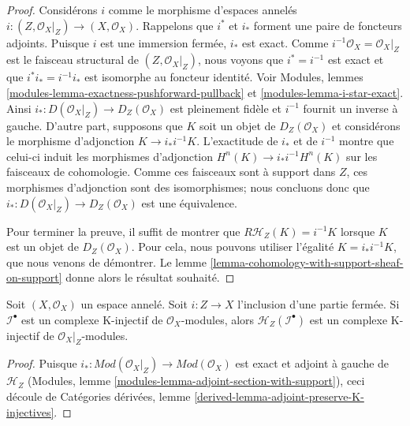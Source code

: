 {\begin{proof}
Considérons $i$ comme le morphisme d'espaces annelés
$i : (Z, \mathcal{O}_X|_Z) \to (X, \mathcal{O}_X)$. Rappelons que $i^*$ et $i_*$ forment une paire de foncteurs adjoints. Puisque $i$ est une immersion fermée, $i_*$ est exact. Comme $i^{-1}\mathcal{O}_X = \mathcal{O}_X|_Z$ est le faisceau structural de $(Z, \mathcal{O}_X|_Z)$, nous voyons que $i^* = i^{-1}$
est exact et que $i^*i_* = i^{-1}i_*$
est isomorphe au foncteur identité. Voir Modules, lemmes \ref{modules-lemma-exactness-pushforward-pullback} et
\ref{modules-lemma-i-star-exact}. Ainsi
$i_* : D(\mathcal{O}_X|_Z) \to D_Z(\mathcal{O}_X)$
est pleinement fidèle et $i^{-1}$ fournit un inverse à gauche. D'autre part, supposons que $K$ soit un objet de
$D_Z(\mathcal{O}_X)$ et considérons le morphisme d'adjonction
$K \to i_*i^{-1}K$. L'exactitude de $i_*$ et de $i^{-1}$ montre que celui-ci induit les morphismes d'adjonction
$H^n(K) \to i_*i^{-1}H^n(K)$ sur les faisceaux de cohomologie. Comme ces faisceaux sont à support dans $Z$, ces morphismes d'adjonction sont des isomorphismes; nous concluons donc que $i_* : D(\mathcal{O}_X|_Z) \to D_Z(\mathcal{O}_X)$
est une équivalence.

\medskip\noindent

Pour terminer la preuve, il suffit de montrer que $R\mathcal{H}_Z(K) = i^{-1}K$ lorsque
$K$ est un objet de $D_Z(\mathcal{O}_X)$. Pour cela, nous pouvons utiliser l'égalité
$K = i_*i^{-1}K$, que nous venons de démontrer. Le lemme \ref{lemma-cohomology-with-support-sheaf-on-support}
donne alors le résultat souhaité.

\end{proof}

\begin{lemma}

\label{lemma-sections-with-support-K-injective}
Soit $(X, \mathcal{O}_X)$ un espace annelé. Soit $i : Z \to X$ l'inclusion d'une partie fermée. Si $\mathcal{I}^\bullet$ est un complexe K-injectif de $\mathcal{O}_X$-modules, alors $\mathcal{H}_Z(\mathcal{I}^\bullet)$ est un complexe K-injectif de $\mathcal{O}_X|_Z$-modules.
\end{lemma}

\begin{proof}
Puisque $i_* : \textit{Mod}(\mathcal{O}_X|_Z) \to \textit{Mod}(\mathcal{O}_X)$ est exact et adjoint à gauche de $\mathcal{H}_Z$ (Modules, lemme \ref{modules-lemma-adjoint-section-with-support}), ceci découle de Catégories dérivées, lemme \ref{derived-lemma-adjoint-preserve-K-injectives}.
\end{proof}

}
